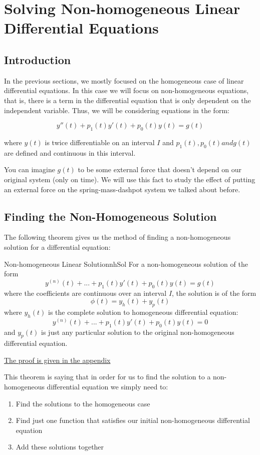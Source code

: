 \documentclass{report}
\begin{document}
\chapter{Solving Non-homogeneous Linear Differential Equations}
\section{Introduction}
In the previous sections, we mostly focused on the homogeneous case of linear differential equations. In this case we will focus on non-homogeneous equations, that is, there is a term in the differential equation that is only dependent on the independent variable. Thus, we will be considering equations in the form:


$$y''(t) + p_1(t)y'(t) + p_0(t)y(t) = g(t)$$

where $y(t)$ is twice differentiable on an interval $I$ and $p_1(t), p_0(t) and g(t)$ are defined and continuous in this interval.

You can imagine $g(t)$ to be some external force that doesn't depend on our original system (only on time). We will use this fact to study the effect of putting an external force on the spring-mass-dashpot system we talked about before.

\section{Finding the Non-Homogeneous Solution}

The following theorem gives us the method of finding a non-homogeneous solution for a differential equation:

\begin{mytheo}{Non-homogeneous Linear Solution}{nhSol}
 For a non-homogeneous solution of the form
 $$y^{(n)}(t) + ... + p_1(t)y'(t) + p_0(t)y(t) = g(t)$$
 where the coefficients are continuous over an interval $I$, the solution is of the form
 $$\phi(t) = y_h(t) + y_p(t)$$
 where $y_h(t)$ is the complete solution to homogeneous differential equation:
 $$y^{(n)}(t) + ... + p_1(t)y'(t) + p_0(t)y(t) = 0$$
 and $y_p(t)$ is just any particular solution to the original non-homogeneous differential equation.
\end{mytheo}

\hyperref[sec:prNhSol]{The proof is given in the appendix}

This theorem is saying that in order for us to find the solution to a non-homogeneous differential equation we simply need to:
\begin{enumerate}
    \item Find the solutions to the homogeneous case
    \item Find just one function that satisfies our initial non-homogeneous differential equation
    \item Add these solutions together
\end{enumerate}
\end{document}
